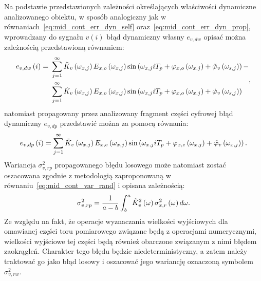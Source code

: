 Na podstawie przedstawionych zależności określających właściwości dynamiczne analizowanego obiektu, w sposób analogiczny jak w równaniach~\eqref{eq:mid_cont_err_dyn_self} oraz~\eqref{eq:mid_cont_err_dyn_prop}, wprowadzany do sygnału $v(i)$ błąd dynamiczny własny $e_{v,dw}$ opisać można zależnością przedstawioną równaniem:
\begin{equation}
\begin{split}
e_{v,dw} \left(i\right) =~
& \sum _{j = 1} ^{\infty} \tilde{K}_{v} \left(\omega_{x,j}\right) E_{x,o} \left(\omega_{x,j}\right) \sin \left( \omega_{x,j} iT_{p} + \varphi_{x,o} \left(\omega_{x,j}\right) + \tilde{\varphi}_{v} \left(\omega_{s,j}\right) \right) - \\
& \sum _{j = 1} ^{\infty} \dot{K}_{v} \left(\omega_{x,j}\right) E_{x,o} \left(\omega_{x,j}\right) \sin \left( \omega_{x,j} iT_{p} + \varphi_{x,o} \left(\omega_{x,j}\right) + \dot{\varphi}_{v} \left(\omega_{s,j}\right) \right)
\end{split}
\label{eq:mid_disc_err_dyn_self},
\end{equation}
natomiast propagowany przez analizowany fragment części cyfrowej błąd dynamiczny $e_{v,dp}$ przedstawić można za pomocą równania:
\begin{equation}
e_{v,dp} \left(i\right) = \sum _{j = 1} ^{\infty} \tilde{K}_{v} \left(\omega_{x,j}\right) E_{x,e} \left(\omega_{x,j}\right) \sin \left( \omega_{x,j} iT_{p} + \varphi_{x,e} \left(\omega_{x,j}\right) + \tilde{\varphi}_{v} \left(\omega_{x,j}\right) \right) \label{eq:mid_disc_err_dyn_prop}.
\end{equation}
Wariancja $\sigma_{v,rp}^{2}$ propagowanego błędu losowego może natomiast zostać oszacowana zgodnie z metodologią zaproponowaną w równaniu~\eqref{eq:mid_cont_var_rand} i opisana zależnością:
\begin{equation}
\sigma_{v,rp}^{2} = \frac{1}{a - b} \int _{b} ^{a} \tilde{K}_{v}^{2} \left(\omega\right) \sigma_{x,r}^{2} \left(\omega\right) d\omega \label{eq:mid_disc_var_rand}.
\end{equation}
Ze względu na fakt, że operacje wyznaczania wielkości wyjściowych dla omawianej części toru pomiarowego związane będą z operacjami numerycznymi, wielkości wyjściowe tej części będą również obarczone związanym z nimi błędem zaokrągleń. Charakter tego błędu będzie niedeterministyczny, a zatem należy traktować go jako błąd losowy i oszacować jego wariancję oznaczoną symbolem $\sigma_{v,rw}^{2}$.

